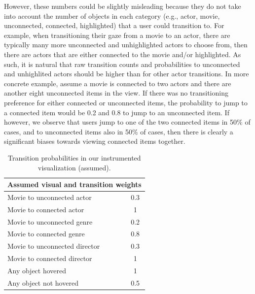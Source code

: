 However, these numbers could be slightly misleading because they do not take into account the number of objects in each category (e.g., actor, movie, unconnected, connected, highlighted) that a  user could transition to. For example, when transitioning their gaze from a movie to an actor, there are typically many more unconnected and unhighlighted actors to choose from, then there are actors that are either connected to the movie and/or highlighted. As such, it is natural that raw transition counts and probabilities to unconnected and unhighlited  actors should be higher than for other actor transitions. In more concrete example, assume a movie is connected to two actors and there are another eight unconnected items in the view. If there was no transitioning preference for either connected or unconnected items, the probability to jump to a connected item would be 0.2 and 0.8 to jump to an unconnected item. If however, we observe that users jump to one of the two connected items in 50\% of cases, and to unconnected items also in 50\% of cases, then there is clearly a significant biases towards viewing connected items together.


\begin{table}[htbp]
	\centering
		\begin{tabular}{|l|c|}
			\hline
			 \multicolumn{2}{|c|}{Assumed visual and transition weights} \\ \hline
			Movie to unconnected actor & 0.3\\\hline
			Movie to connected actor & 1\\\hline
			Movie to unconnected genre & 0.2\\\hline
			Movie to connected genre & 0.8\\\hline
			Movie to unconnected director & 0.3\\\hline
			Movie to connected director & 1\\\hline
			Any object hovered & 1\\\hline
			Any object not hovered & 0.5\\
			\hline			
		\end{tabular}
	\caption{Transition probabilities in our instrumented visualization (assumed).}
	\label{tab:Transition2}
\end{table}


